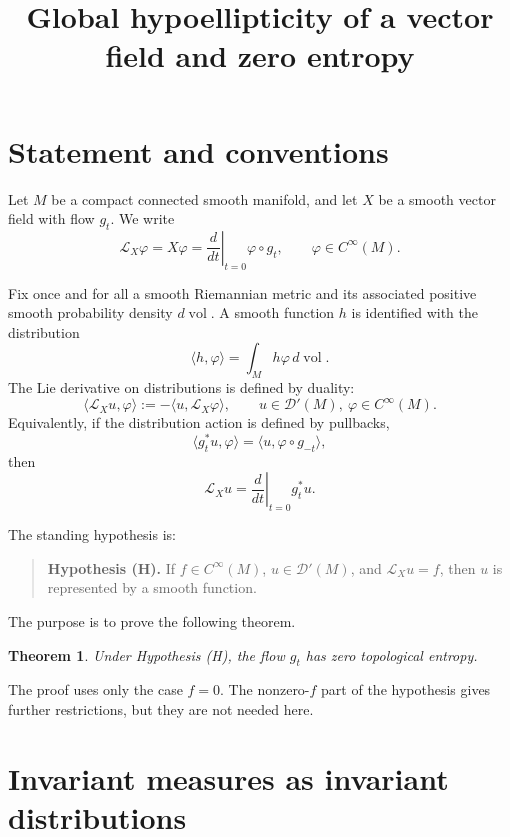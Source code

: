 \documentclass[11pt]{article}
\newtheorem{theorem}{Theorem}[section]
\theoremstyle{definition}
\theoremstyle{remark}
\newcommand{\Cinf}{C^\infty}
\newcommand{\Dist}{\mathcal D'}
\newcommand{\vol}{\operatorname{vol}}
\begin{document}
\title{Global hypoellipticity of a vector field and zero entropy}
\author{}
\date{}
\maketitle

\section{Statement and conventions}

Let \(M\) be a compact connected smooth manifold, and let \(X\) be a
smooth vector field with flow \(g_t\).  We write
\[
\mathcal L_X\varphi=X\varphi
   =\left.\frac{d}{dt}\right|_{t=0}\varphi\circ g_t ,
   \qquad \varphi\in\Cinf(M).
\]

Fix once and for all a smooth Riemannian metric and its associated
positive smooth probability density \(d\vol\).  A smooth function
\(h\) is identified with the distribution
\[
\langle h,\varphi\rangle=\int_M h\varphi\,d\vol .
\]
The Lie derivative on distributions is defined by duality:
\begin{equation}\label{eq:Lie-dist}
\langle \mathcal L_Xu,\varphi\rangle
   :=-\langle u,\mathcal L_X\varphi\rangle ,
   \qquad u\in\Dist(M),\ \varphi\in\Cinf(M).
\end{equation}
Equivalently, if the distribution action is defined by pullbacks,
\[
\langle g_t^*u,\varphi\rangle
   =\langle u,\varphi\circ g_{-t}\rangle,
\]
then
\[
\mathcal L_Xu=\left.\frac{d}{dt}\right|_{t=0}g_t^*u .
\]

The standing hypothesis is:

\begin{quote}
\textbf{Hypothesis (H).}
If \(f\in\Cinf(M)\), \(u\in\Dist(M)\), and
\(\mathcal L_Xu=f\), then \(u\) is represented by a smooth function.
\end{quote}

The purpose is to prove the following theorem.

\begin{theorem}\label{thm:main}
Under Hypothesis {\rm (H)}, the flow \(g_t\) has zero topological
entropy.
\end{theorem}

The proof uses only the case \(f=0\).  The nonzero-\(f\) part of the
hypothesis gives further restrictions, but they are not needed here.

\section{Invariant measures as invariant distributions}
\end{document}
